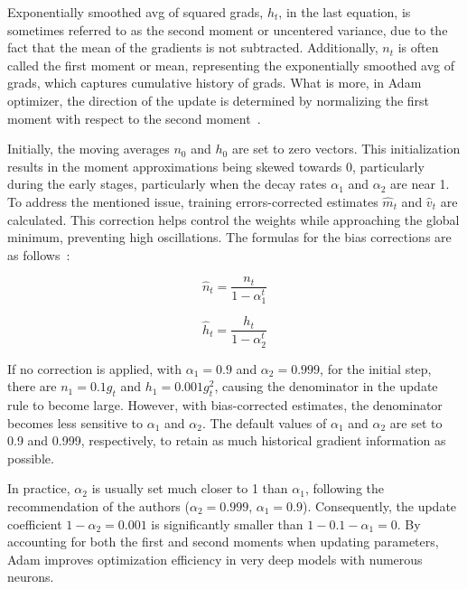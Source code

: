 \documentclass[12pt,a4paper]{report}
\begin{document}
Exponentially smoothed avg of squared grads, \( h_t \), in the last equation, is sometimes referred to as the second moment or uncentered variance, due to the fact that the mean of the gradients is not subtracted. Additionally, \( n_t \) is often called the first moment or mean, representing the exponentially smoothed avg of grads, which captures cumulative history of grads. What is more, in Adam optimizer, the direction of the update is determined by normalizing the first moment with respect to the second moment~\cite{adamoptimizerw}.

Initially, the moving averages \( n_0 \) and \( h_0 \) are set to zero vectors. This initialization results in the moment approximations being skewed towards 0, particularly during the early stages, particularly when the decay rates \( \alpha_1 \) and \( \alpha_2 \) are near 1. To address the mentioned issue, training errors-corrected estimates \( \hat{m}_t \) and \( \hat{v}_t \) are calculated. This correction helps control the weights while approaching the global minimum, preventing high oscillations. The formulas for the bias corrections are as follows~\cite{adamoptimizerw}:

\begin{equation}
  \hat{n}_t = \frac{n_t}{1 - \alpha_1^t}
\end{equation}

\begin{equation}
  \hat{h}_t = \frac{h_t}{1 - \alpha_2^t}
\end{equation}

If no correction is applied, with \(\alpha_1 = 0.9\) and \(\alpha_2 = 0.999\), for the initial step, there are \(n_1 = 0.1 g_t\) and \(h_1 = 0.001 g_t^2\), causing the denominator in the update rule to become large. However, with bias-corrected estimates, the denominator becomes less sensitive to \(\alpha_1\) and \(\alpha_2\). The default values of \(\alpha_1\) and \(\alpha_2\) are set to 0.9 and 0.999, respectively, to retain as much historical gradient information as possible.

In practice, \(\alpha_2\) is usually set much closer to 1 than \(\alpha_1\), following the recommendation of the authors (\(\alpha_2 = 0.999\), \(\alpha_1 = 0.9\)). Consequently, the update coefficient \(1 - \alpha_2 = 0.001\) is significantly smaller than \(1 - 0.1 - \alpha_1 = 0\). By accounting for both the first and second moments when updating parameters, Adam improves optimization efficiency in very deep models with numerous neurons.
\end{document}
